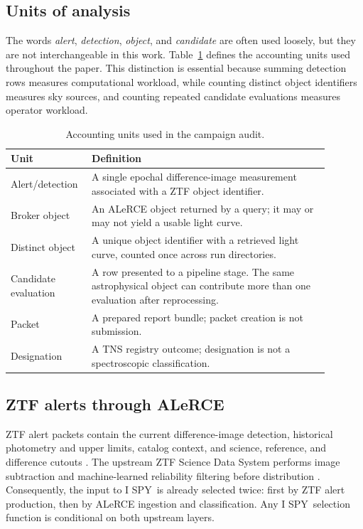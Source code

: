 \documentclass[11pt]{article}
\newcommand{\legacycampaign}{I SPY}
\begin{document}
\subsection{Units of analysis}

The words \emph{alert}, \emph{detection}, \emph{object}, and \emph{candidate} are often used loosely, but they are not interchangeable in this work. Table~\ref{tab:units} defines the accounting units used throughout the paper. This distinction is essential because summing detection rows measures computational workload, while counting distinct object identifiers measures sky sources, and counting repeated candidate evaluations measures operator workload.

\begin{table}[ht]
\centering
\caption{Accounting units used in the campaign audit.}
\label{tab:units}
\begin{tabular}{p{0.19\linewidth}p{0.70\linewidth}}
\toprule
Unit & Definition \\
\midrule
Alert/detection & A single epochal difference-image measurement associated with a ZTF object identifier. \\
Broker object & An ALeRCE object returned by a query; it may or may not yield a usable light curve. \\
Distinct object & A unique object identifier with a retrieved light curve, counted once across run directories. \\
Candidate evaluation & A row presented to a pipeline stage. The same astrophysical object can contribute more than one evaluation after reprocessing. \\
Packet & A prepared report bundle; packet creation is not submission. \\
Designation & A TNS registry outcome; designation is not a spectroscopic classification. \\
\bottomrule
\end{tabular}
\end{table}

\subsection{ZTF alerts through ALeRCE}

ZTF alert packets contain the current difference-image detection, historical photometry and upper limits, catalog context, and science, reference, and difference cutouts \citep{patterson2019}. The upstream ZTF Science Data System performs image subtraction and machine-learned reliability filtering before distribution \citep{masci2019,duev2019}. Consequently, the input to \legacycampaign\ is already selected twice: first by ZTF alert production, then by ALeRCE ingestion and classification. Any \legacycampaign\ selection function is conditional on both upstream layers.
\end{document}

